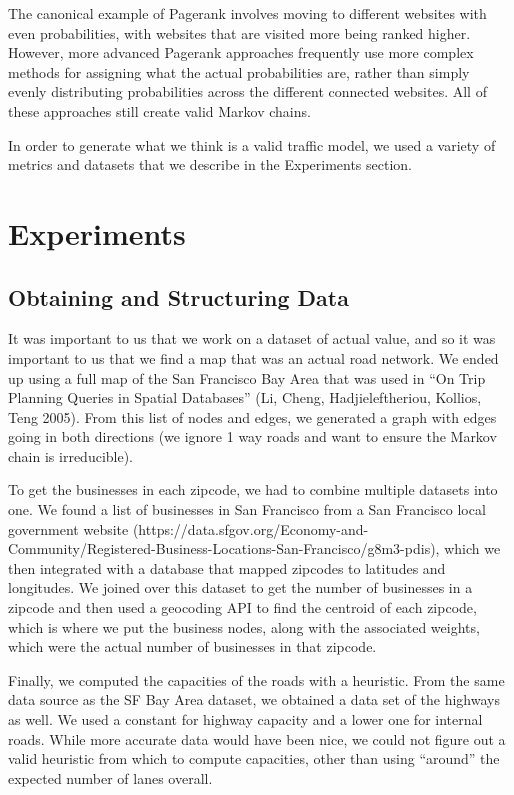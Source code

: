 \documentclass{article}
\begin{document}
The canonical example of Pagerank involves moving to different websites with even probabilities, with websites that are visited more being ranked higher. However, more advanced Pagerank approaches frequently use more complex methods for assigning what the actual probabilities are, rather than simply evenly distributing probabilities across the different connected websites. All of these approaches still create valid Markov chains. 

In order to generate what we think is a valid traffic model, we used a variety of metrics and datasets that we describe in the Experiments section.
\section{Experiments}
\subsection{Obtaining and Structuring Data}
It was important to us that we work on a dataset of actual value, and so it was important to us that we find a map that was an actual road network. We ended up using a full map of the San Francisco Bay Area that was used in ``On Trip Planning Queries in Spatial Databases'' (Li, Cheng, Hadjieleftheriou, Kollios, Teng 2005). From this list of nodes and edges, we generated a graph with edges going in both directions (we ignore 1 way roads and want to ensure the Markov chain is irreducible). 

To get the businesses in each zipcode, we had to combine multiple datasets into one. We found a list of businesses in San Francisco from a San Francisco local government website (https://data.sfgov.org/Economy-and-Community/Registered-Business-Locations-San-Francisco/g8m3-pdis), which we then integrated with a database that mapped zipcodes to latitudes and longitudes. We joined over this dataset to get the number of businesses in a zipcode and then used a geocoding API to find the centroid of each zipcode, which is where we put the business nodes, along with the associated weights, which were the actual number of businesses in that zipcode.

Finally, we computed the capacities of the roads with a heuristic. From the same data source as the SF Bay Area dataset, we obtained a data set of the highways as well. We used a constant for highway capacity and a lower one for internal roads. While more accurate data would have been nice, we could not figure out a valid heuristic from which to compute capacities, other than using ``around'' the expected number of lanes overall.  
\end{document}
